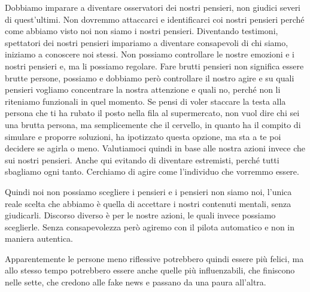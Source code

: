 \documentclass[12pt]{book} %
\begin{document}
Dobbiamo imparare a diventare osservatori dei nostri pensieri, non giudici severi di quest'ultimi. Non dovremmo
attaccarci e identificarci coi nostri pensieri perché come abbiamo visto noi non siamo i nostri pensieri. Diventando
testimoni, spettatori dei nostri pensieri impariamo a diventare consapevoli di chi siamo, iniziamo a conoscere noi
stessi. Non possiamo controllare le nostre emozioni e i nostri pensieri e, ma li possiamo regolare. Fare brutti
pensieri non significa essere brutte persone, possiamo e dobbiamo però controllare il nostro agire e su quali pensieri
vogliamo concentrare la nostra attenzione e quali no, perché non li riteniamo funzionali in quel momento. Se pensi di
voler staccare la testa alla persona che ti ha rubato il posto nella fila al supermercato, non vuol dire chi sei una
brutta persona, ma semplicemente che il cervello, in quanto ha il compito di simulare e proporre soluzioni, ha
ipotizzato questa opzione, ma sta a te poi decidere se agirla o meno. Valutiamoci quindi in base alle nostra azioni
invece che sui nostri pensieri. Anche qui evitando di diventare estremisti, perché tutti sbagliamo ogni tanto.
Cerchiamo di agire come l'individuo che vorremmo essere.

Quindi noi non possiamo scegliere i pensieri e i pensieri non siamo noi, l'unica reale scelta che
abbiamo è quella di accettare i nostri contenuti mentali, senza giudicarli. Discorso diverso è per le nostre azioni, le
quali invece possiamo sceglierle. Senza consapevolezza però agiremo con il pilota automatico e non in maniera
autentica.

Apparentemente le persone meno riflessive potrebbero quindi essere più felici, ma allo stesso tempo potrebbero essere anche quelle più influenzabili, che finiscono nelle sette, che credono alle fake news e passano da una paura all'altra.
\end{document}
